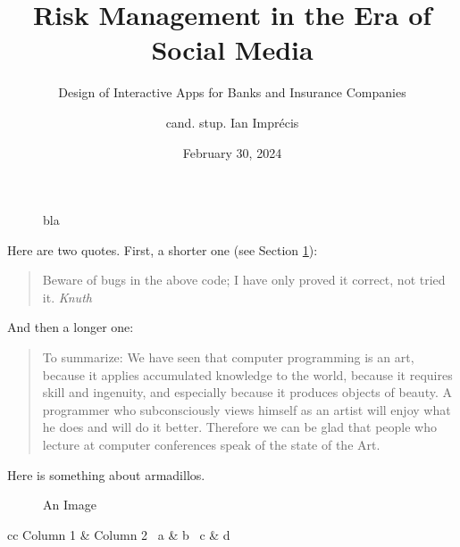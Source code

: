 \documentclass{scrreprt}
\begin{document}
	\titlehead{\Large University of Smartville}
	\subject{Master's Thesis}
	\title{Risk Management in the Era of Social Media}
	\subtitle{Design of Interactive Apps for Banks and
	Insurance Companies}
	\author{cand. stup. Ian Imprécis}
	\date{February 30, 2024}
	\publishers{Supervised by Prof. Dr. Smartypants}
	\dedication{For my Mom.}

	\maketitle

	\begin{abstract}
		\noindent\blindtext
	\end{abstract}

	\tableofcontents
	\listoffigures
	\listoftables

	\blinddocument

	\begin{figure}
		\caption{bla \label{fig:end}}
	\end{figure}

	Here are two quotes. First, a shorter one (see Section \cref{fig:end}):
	\begin{quote}
		Beware of bugs in the above code; I have only proved it correct, not tried it. \hfill\textit{Knuth}
	\end{quote}
	And then a longer one:
	\begin{quotation}
		To summarize: We have seen that computer programming is an art, because it applies accumulated knowledge to the world, because it requires skill and ingenuity, and especially because it produces objects of beauty. A programmer who subconsciously views himself as an artist will enjoy what he does and will do it better. Therefore we can be glad that people who lecture at computer conferences speak of the state of the Art. \cite{knuth74}
	\end{quotation}

	Here is something about armadillos. \cite{author88}  \blindtext[3]

	\begin{figure}
		\centering
		\caption{An Image}
		\label{fig:theimage}
	\end{figure}

	\begin{table}
		\centering
		\begin{tabular}{cc}
			\toprule
			Column 1 & Column 2\
			\midrule
			a & b \
			c & d
		\end{tabular}
		\caption{A Table}
		\label{tab:thetable}
	\end{table}
\end{document}

